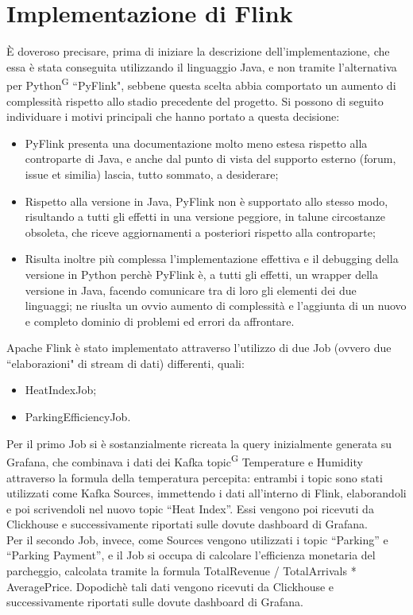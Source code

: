 \documentclass[8pt]{article}
\newcommand{\glossterm}[1]{#1\textsuperscript{G}} %
\begin{document}
\section{Implementazione di Flink}
È doveroso precisare, prima di iniziare la descrizione dell'implementazione, che essa è stata conseguita utilizzando il linguaggio Java, e non tramite l'alternativa
per \glossterm{Python} ``PyFlink", sebbene questa scelta abbia comportato un aumento di complessità rispetto allo stadio precedente del progetto. Si possono di seguito individuare i motivi principali che hanno portato a questa decisione:\\
\begin{itemize}
	\item PyFlink presenta una documentazione molto meno estesa rispetto alla controparte di Java, e anche dal punto di vista del supporto esterno (forum, issue et similia) lascia, tutto sommato, a desiderare; 
	\item Rispetto alla versione in Java, PyFlink non è supportato allo stesso modo, risultando a tutti gli effetti in una versione peggiore, in talune circostanze obsoleta, che riceve aggiornamenti a posteriori rispetto alla controparte;
	\item Risulta inoltre più complessa l'implementazione effettiva e il debugging della versione in Python perchè PyFlink è, a tutti gli effetti, un wrapper della versione in Java, facendo comunicare tra di loro gli elementi dei due linguaggi; ne riuslta un ovvio aumento di complessità e l'aggiunta di un nuovo e completo dominio di problemi ed errori da affrontare.  
\end{itemize}
Apache Flink è stato implementato attraverso l'utilizzo di due Job (ovvero due ``elaborazioni" di stream di dati) differenti, quali:
\begin{itemize}
	\item HeatIndexJob;
	\item ParkingEfficiencyJob.
\end{itemize}
Per il primo Job si è sostanzialmente ricreata la query inizialmente generata su Grafana, che combinava i dati dei Kafka \glossterm{topic} Temperature e Humidity attraverso 
la formula della temperatura percepita: entrambi i topic sono stati utilizzati come Kafka Sources, immettendo i dati all'interno di Flink, elaborandoli e poi scrivendoli 
nel nuovo topic ``Heat Index''. Essi vengono poi ricevuti da Clickhouse e successivamente riportati sulle dovute dashboard di Grafana. \\
Per il secondo Job, invece, come Sources vengono utilizzati i topic ``Parking'' e ``Parking Payment'', e il Job si occupa di calcolare l'efficienza monetaria del parcheggio, calcolata tramite 
la formula Total\textunderscore Revenue / Total\textunderscore Arrivals * Average\textunderscore Price. Dopodichè tali dati vengono ricevuti da Clickhouse e successivamente riportati sulle dovute dashboard di Grafana. 
\end{document}
